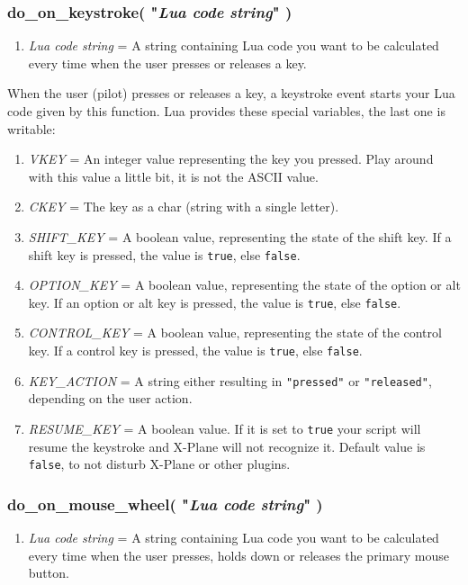 \documentclass[11pt,parskip=half,a4paper]{scrartcl}
\begin{document}
\subsubsection{do\_on\_keystroke( "\emph{Lua code string}" )}

\begin{enumerate}
	\item \emph{Lua code string} = A string containing Lua code you want to be calculated every time when the user presses or releases a key.
\end{enumerate}

When the user (pilot) presses or releases a key, a keystroke event starts your Lua code given by this function. Lua provides these special variables, the last one is writable:

\begin{enumerate}
	\item \emph{VKEY} = An integer value representing the key you pressed. Play around with this value a little bit, it is not the ASCII value.
	\item \emph{CKEY} = The key as a char (string with a single letter).
	\item \emph{SHIFT\_KEY} = A boolean value, representing the state of the shift key. If a shift key is pressed, the value is \verb|true|, else \verb|false|.
	\item \emph{OPTION\_KEY} = A boolean value, representing the state of the option or alt key. If an option or alt key is pressed, the value is \verb|true|, else \verb|false|.
	\item \emph{CONTROL\_KEY} = A boolean value, representing the state of the control key. If a control key is pressed, the value is \verb|true|, else \verb|false|.
	\item \emph{KEY\_ACTION} = A string either resulting in \verb|"pressed"| or \verb|"released"|, depending on the user action.
	\item \emph{RESUME\_KEY} = A boolean value. If it is set to \verb|true| your script will resume the keystroke and X-Plane will not recognize it. Default value is \verb|false|, to not disturb X-Plane or other plugins.
\end{enumerate}

\subsubsection{do\_on\_mouse\_wheel( "\emph{Lua code string}" )}

\begin{enumerate}
	\item \emph{Lua code string} = A string containing Lua code you want to be calculated every time when the user presses, holds down or releases the primary mouse button.
\end{enumerate}
\end{document}
